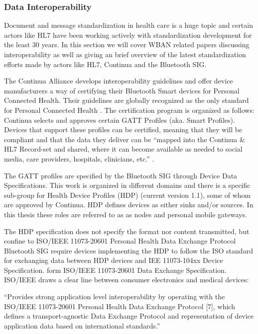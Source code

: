 \subsubsection{Data Interoperability} %
\label{ssub:data_interoperability}


Document and message standardization in health care is a huge topic and certain actors like HL7 have been working actively with standardization development for the least 30 years. In this section we will cover WBAN related papers discussing interoperability as well as giving an brief overview of the latest standardization efforts made by actors like HL7, Continua and the Bluetooth SIG.

The Continua Alliance develops interoperability guidelines and offer device manufacturers a way of certifying their Bluetooth Smart devices for Personal Connected Health. Their guidelines are globally recognized as the only standard for Personal Connected Health \cite{newRef:27}. The certification program is organized as follows: Continua selects and approves certain GATT Profiles (aka. Smart Profiles). Devices that support these profiles can be certified, meaning that they will be compliant and that the data they deliver can be ``mapped into the Continua & HL7 Record-set and shared, where it can become available as needed to social media, care providers, hospitals, clinicians, etc.'' \cite{newRef:27}.

The GATT profiles are specified by the Bluetooth SIG through Device Data Specifications. This work is organized in different domains and there is a specific sub-group for Health Device Profiles (HDP) (current version 1.1), some of whom are approved by Continua. HDP defines devices as either sinks and/or sources. In this thesis these roles are referred to as as nodes and personal mobile gateways.

The HDP specification does not specify the format nor content transmitted, but confine to ISO/IEEE 11073-20601 Personal Health Data Exchange Protocol \cite{newRef:18} Bluetooth SIG require devices implementing the HDP to follow the ISO standard for exchanging data between HDP devices and IEE 11073-104xx Device Specification. form ISO/IEEE 11073-20601 Data Exchange Specification. ISO/IEEE draws a clear line between consumer electronics and medical devices: 

``Provides strong application level interoperability by operating with the ISO/IEEE 11073-20601 Personal Health Data Exchange Protocol [7], which defines a transport-agnostic Data Exchange Protocol and representation of device application data based on international standards.''

